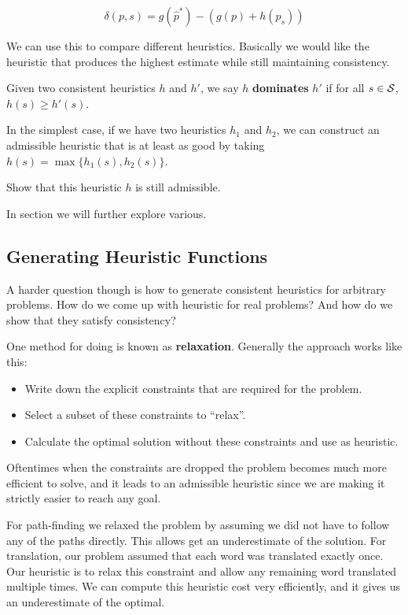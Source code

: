 \documentclass[11pt]{article}
\begin{document}
\[\delta(p, s) = g(\hat{p}^*) - (g(p) + h(p_s)) \] 

We can use this to compare different heuristics. Basically we would like 
the heuristic that produces the highest estimate while still maintaining 
consistency.

\begin{defn}
  Given two consistent heuristics $h$ and $h'$, we say $h$ \textbf{dominates} $h'$ if 
  for all $s\in\mathcal{S}$, $h(s) \geq h'(s)$. 
\end{defn}

In the simplest case, if we have two heuristics $h_1$ and $h_2$, we
can construct an admissible heuristic that is at least as good by
taking $h(s) = \max\{ h_1(s), h_2(s)\}$.

\begin{exercise}
  Show that this heuristic $h$ is still admissible.
\end{exercise}
    
In section we will further explore various.

\subsection{Generating Heuristic Functions}

A harder question though is how to generate consistent heuristics for arbitrary problems. How do we come up with heuristic for real problems? And how do we show that they satisfy consistency? 

One method for doing is known as \textbf{relaxation}. Generally the approach works like this:

\begin{itemize}
\item Write down the explicit constraints that are required for the problem. 
\item Select a subset of these constraints to ``relax''.
\item Calculate the optimal solution without these constraints and use as heuristic.   
\end{itemize}

Oftentimes when the constraints are dropped the problem becomes much more efficient to solve, and it leads to an admissible heuristic since we are making it strictly easier to reach any goal.

For path-finding we relaxed the problem by assuming we did not have to follow any of the paths directly. This allows get an underestimate of the solution. For translation, our problem assumed that each word was translated exactly once. Our heuristic is to relax this constraint and allow any remaining word translated multiple times. We can compute this heuristic cost very efficiently, and it gives us an underestimate of the optimal. 
\end{document}
